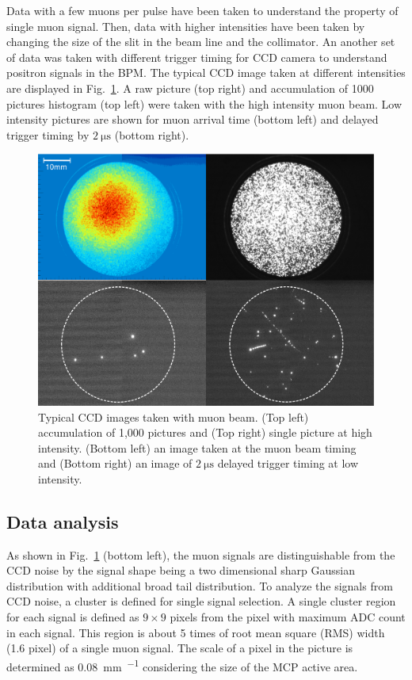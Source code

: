 \documentclass[preprint,3p,twocolumn]{elsarticle}
\begin{document}
Data with a few muons per pulse have been taken to understand the
property of single muon signal.  Then, data with higher
intensities have been taken by changing the size of the slit in
the beam line and the collimator.  An another set of data was
taken with different trigger timing for CCD camera to understand
positron signals in the BPM.  The typical CCD image taken at
different intensities are displayed in
Fig.~\ref{fig:single_cluster}.  A raw picture (top right) and
accumulation of 1000 pictures histogram (top left) were taken
with the high intensity muon beam. Low intensity pictures are
shown for muon arrival time (bottom left) and delayed trigger
timing by $\SI{2}{\micro\s}$ (bottom right).

\begin{figure}[tbp]
	\centering
	\includegraphics[width=\columnwidth]{figure/fig3_v2.pdf}
	\caption{Typical CCD images taken with muon beam. (Top
          left) accumulation of 1,000 pictures and (Top right)
          single picture at high intensity.  (Bottom left) an
          image taken at the muon beam timing and (Bottom right)
          an image of $\SI{2}{\micro\s}$ delayed trigger timing
          at low intensity.  }
	\vspace{-0.4cm}
	\label{fig:single_cluster}
\end{figure}

\subsection{Data analysis}

As shown in Fig.~\ref{fig:single_cluster} (bottom left), the muon
signals are distinguishable from the CCD noise by the signal
shape being a two dimensional sharp Gaussian distribution with
additional broad tail distribution.  To analyze the signals from
CCD noise, a cluster is defined for single signal selection. A
single cluster region for each signal is defined as $9 \times 9$
pixels from the pixel with maximum ADC count in each signal. This
region is about 5 times of root mean square (RMS) width (1.6
pixel) of a single muon signal. The scale of a pixel in the
picture is determined as \SI{0.08}{\mm \per \pixel} considering
the size of the MCP active area.
\end{document}

